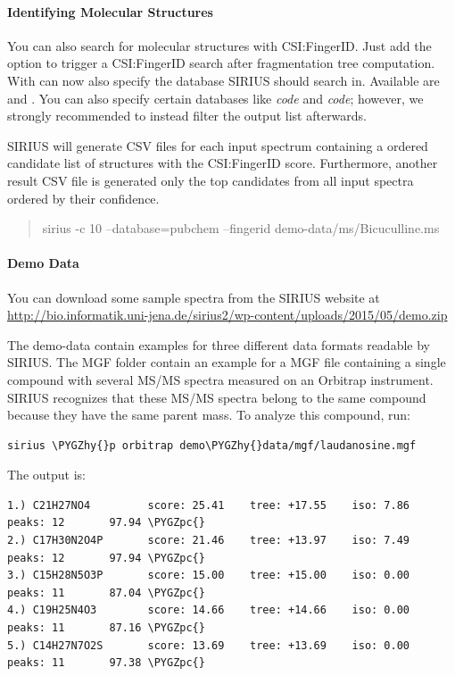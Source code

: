 \documentclass[letterpaper,10pt,openany,oneside]{sphinxmanual}
\def\PYGZpc{\char`\%}
\def\PYGZhy{\char`\-}
\begin{document}
\paragraph{Identifying Molecular Structures}
\label{commandline:identifying-molecular-structures}

You can also search for molecular structures with
CSI:FingerID. Just add the option  to trigger a CSI:FingerID
search after fragmentation tree computation. With  can now
also specify the database SIRIUS should search in. Available
are  and .  You can also specify certain databases
like \emph{code} and \emph{code}; however, we strongly recommended to instead
filter the output list afterwards.

SIRIUS will generate CSV files for each input spectrum containing a ordered candidate list of structures with the CSI:FingerID score. Furthermore, another result CSV file is generated only the top candidates from all input spectra ordered by their confidence.
\begin{quote}

sirius -c 10 --database=pubchem --fingerid demo-data/ms/Bicuculline.ms
\end{quote}


\paragraph{Demo Data}
\label{commandline:demo-data}

You can download some sample spectra from the SIRIUS website
at \url{http://bio.informatik.uni-jena.de/sirius2/wp-content/uploads/2015/05/demo.zip}

The demo-data contain examples for three different data formats readable by
SIRIUS. The MGF folder contain an example for a MGF file containing a single
compound with several MS/MS spectra measured on an Orbitrap
instrument. SIRIUS recognizes that these MS/MS spectra belong to the same
compound because they have the same parent mass. To analyze this compound,
run:
%
\begin{Verbatim}[commandchars=\\\{\}]
sirius \PYGZhy{}p orbitrap demo\PYGZhy{}data/mgf/laudanosine.mgf
\end{Verbatim}

The output is:
%
\begin{Verbatim}[commandchars=\\\{\}]
1.) C21H27NO4         score: 25.41    tree: +17.55    iso: 7.86       peaks: 12       97.94 \PYGZpc{}
2.) C17H30N2O4P       score: 21.46    tree: +13.97    iso: 7.49       peaks: 12       97.94 \PYGZpc{}
3.) C15H28N5O3P       score: 15.00    tree: +15.00    iso: 0.00       peaks: 11       87.04 \PYGZpc{}
4.) C19H25N4O3        score: 14.66    tree: +14.66    iso: 0.00       peaks: 11       87.16 \PYGZpc{}
5.) C14H27N7O2S       score: 13.69    tree: +13.69    iso: 0.00       peaks: 11       97.38 \PYGZpc{}
\end{Verbatim}
\end{document}
